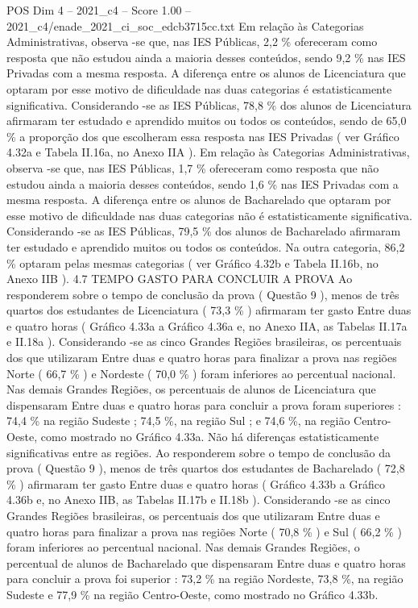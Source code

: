 \begin{textsample}{POS Dim 4 – 2021\_c4 – Score 1.00 – 2021\_c4/enade\_2021\_ci\_soc\_edcb3715cc.txt}
Em relação às Categorias Administrativas, observa -se que, nas IES Públicas, 2,2 \% ofereceram como resposta que não estudou ainda a maioria desses conteúdos, sendo 9,2 \% nas IES Privadas com a mesma resposta.
A diferença entre os alunos de Licenciatura que optaram por esse motivo de dificuldade nas duas categorias é estatisticamente significativa.
Considerando -se as IES Públicas, 78,8 \% dos alunos de Licenciatura afirmaram ter estudado e aprendido muitos ou todos os conteúdos, sendo de 65,0 \% a proporção dos que escolheram essa resposta nas IES Privadas ( ver Gráfico 4.32a e Tabela II.16a, no Anexo IIA ).
Em relação às Categorias Administrativas, observa -se que, nas IES Públicas, 1,7 \% ofereceram como resposta que não estudou ainda a maioria desses conteúdos, sendo 1,6 \% nas IES Privadas com a mesma resposta.
A diferença entre os alunos de Bacharelado que optaram por esse motivo de dificuldade nas duas categorias não é estatisticamente significativa.
Considerando -se as IES Públicas, 79,5 \% dos alunos de Bacharelado afirmaram ter estudado e aprendido muitos ou todos os conteúdos.
Na outra categoria, 86,2 \% optaram pelas mesmas categorias ( ver Gráfico 4.32b e Tabela II.16b, no Anexo IIB ). 4.7 TEMPO GASTO PARA CONCLUIR A PROVA Ao responderem sobre o tempo de conclusão da prova ( Questão 9 ), menos de três quartos dos estudantes de Licenciatura ( 73,3 \% ) afirmaram ter gasto Entre duas e quatro horas ( Gráfico 4.33a a Gráfico 4.36a e, no Anexo IIA, as Tabelas II.17a e II.18a ).
Considerando -se as cinco Grandes Regiões brasileiras, os percentuais dos que utilizaram Entre duas e quatro horas para finalizar a prova nas regiões Norte ( 66,7 \% ) e Nordeste ( 70,0 \% ) foram inferiores ao percentual nacional.
Nas demais Grandes Regiões, os percentuais de alunos de Licenciatura que dispensaram Entre duas e quatro horas para concluir a prova foram superiores : 74,4 \% na região Sudeste ; 74,5 \%, na região Sul ; e 74,6 \%, na região Centro-Oeste, como mostrado no Gráfico 4.33a.
Não há diferenças estatisticamente significativas entre as regiões.
Ao responderem sobre o tempo de conclusão da prova ( Questão 9 ), menos de três quartos dos estudantes de Bacharelado ( 72,8 \% ) afirmaram ter gasto Entre duas e quatro horas ( Gráfico 4.33b a Gráfico 4.36b e, no Anexo IIB, as Tabelas II.17b e II.18b ).
Considerando -se as cinco Grandes Regiões brasileiras, os percentuais dos que utilizaram Entre duas e quatro horas para finalizar a prova nas regiões Norte ( 70,8 \% ) e Sul ( 66,2 \% ) foram inferiores ao percentual nacional.
Nas demais Grandes Regiões, o percentual de alunos de Bacharelado que dispensaram Entre duas e quatro horas para concluir a prova foi superior : 73,2 \% na região Nordeste, 73,8 \%, na região Sudeste e 77,9 \% na região Centro-Oeste, como mostrado no Gráfico 4.33b.

\end{textsample}
